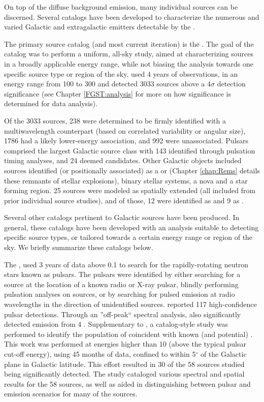 On top of the diffuse background emission, many individual \gam{} sources can be discerned. Several catalogs have been developed to characterize the numerous and  varied Galactic and extragalactic \gam{} emitters detectable by the \lat{}. 

The primary \lat{} source catalog (and most current iteration) is the \threefgl{} \citep{3FGL}. The goal of the catalog was to perform a uniform, all-sky study, aimed at characterizing sources in a  broadly applicable energy range, while not biasing the analysis towards one specific source type or region of the sky. \threefgl{} used 4 years of observations, in an energy range from 100\mev{} to 300\gev{} and detected 3033 sources above a 4$\sigma$ detection significance (see Chapter \ref{FGST:analysis} for more on how significance is determined for \lat{} data analysis). 

Of the 3033 sources, 238 were determined to be firmly identified with a multiwavelength counterpart (based on correlated variability or angular size), 1786 had a likely lower-energy association, and 992 were unassociated. Pulsars comprised the largest Galactic source class with  143 identified through pulsation timing analyses, and 24 deemed candidates.  Other Galactic objects included sources identified (or positionally associated) as a \snr{} or \pwn{} (Chapter \ref{chap:Rems} details these remnants of stellar explosions), binary stellar systems, a nova and a star forming region.  25 sources were modeled as spatially extended (all included from prior individual source studies), and of those, 12 were identified as \snrs{} and 9 as \pwne{}.

Several other \lat{} catalogs pertinent to Galactic \gam{} sources have been produced. In general, these catalogs have been developed with an analysis suitable to detecting specific source types, or tailored towards a certain energy range or region of the sky. We briefly summarize these catalogs below.

The \twopc{}, \citep{2PC} used 3 years of \lat{} data above 0.1\gev{} to search for the rapidly-rotating neutron stars known as pulsars. The \gam{} pulsars were identified by either searching for a \gam{} source at the location of a known radio or X-ray pulsar, blindly performing pulsation analyses on \lat{} sources, or by searching for pulsed emission at radio wavelengths in the direction of unidentified \gam{}  sources. \twopc{} reported 117 high-confidence pulsar detections. Through an ''off-peak`` spectral analysis, \twopc{} also significantly detected emission from 4 \pwne{}. Supplementary to \twopc{}, a catalog-style study was performed to identify the population of \lat{} \pwne{}  coincident with known (and potential)\tev{} \pwne{} \citep{Acero13}. This work was performed at energies higher than 10\gev{} (above the typical pulsar cut-off energy), using 45 months of \lat{} data, confined to within 5$^\circ{}$ of the Galactic plane in Galactic latitude. This effort resulted in 30 of the 58 sources studied being significantly detected. The study cataloged various spectral and spatial results for the 58 sources, as well as aided in distinguishing between pulsar and \pwne{} emission scenarios for many of the sources.

